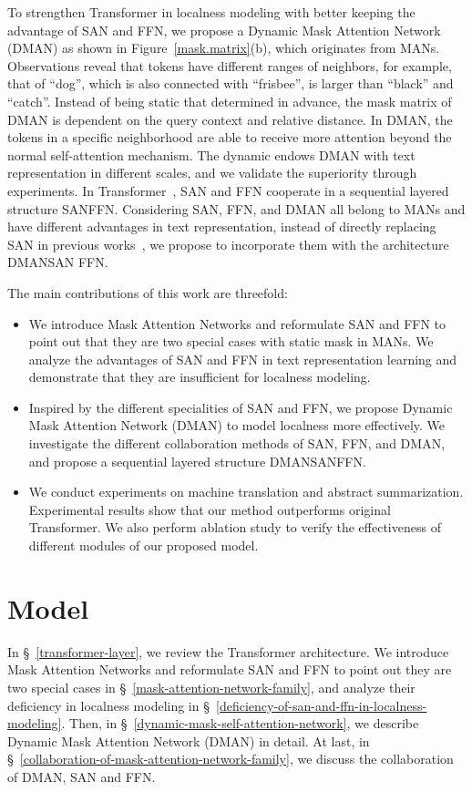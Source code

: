 \documentclass[11pt]{article}
\begin{document}
To strengthen Transformer in localness modeling with better keeping the advantage of SAN and FFN, we propose a Dynamic Mask Attention Network (DMAN) as shown in Figure~\ref{mask.matrix}(b), which originates from MANs. Observations reveal that tokens have different ranges of neighbors, for example, that of ``dog'', which is also connected with ``frisbee'', is larger than ``black'' and ``catch''.
Instead of being static that determined in advance, the mask matrix of DMAN is dependent on the query context and relative distance. 
In DMAN, the tokens in a specific neighborhood are able to receive more attention beyond the normal self-attention mechanism. The dynamic endows DMAN with text representation in different scales, and we validate the superiority through experiments. In Transformer~\cite{vaswani2017attention}, SAN and FFN cooperate in a sequential layered structure SANFFN. Considering SAN, FFN, and DMAN all belong to MANs and have different advantages in text representation, instead of directly replacing SAN in previous works~\cite{shaw2018self,yang2018modeling,guo2019gaussian}, we propose to incorporate them with the architecture DMANSAN FFN.




The main contributions of this work are threefold:
\begin{itemize}
\item We introduce Mask Attention Networks and reformulate SAN and FFN to point out that they are two special cases with static mask in MANs. We analyze the advantages of SAN and FFN in text representation learning and demonstrate that they are insufficient for localness modeling.
\item Inspired by the different specialities of SAN and FFN, we propose Dynamic Mask Attention Network (DMAN) to model localness more effectively. We investigate the different collaboration methods of SAN, FFN, and DMAN, and propose a sequential layered structure DMANSANFFN.
\item We conduct experiments on machine translation and abstract summarization. Experimental results show that our method outperforms original Transformer. We also perform ablation study to verify the effectiveness of different modules of our proposed model.
\end{itemize}

\section{Model}
In \S~\ref{transformer-layer}, we review the Transformer architecture. We introduce Mask Attention Networks and reformulate SAN and FFN to point out they are two special cases in \S~\ref{mask-attention-network-family}, and analyze their deficiency in localness modeling in \S~\ref{deficiency-of-san-and-ffn-in-localness-modeling}. Then, in \S~\ref{dynamic-mask-self-attention-network}, we describe Dynamic Mask Attention Network (DMAN) in detail. At last, in \S~\ref{collaboration-of-mask-attention-network-family}, we discuss the collaboration of DMAN, SAN and FFN.
\end{document}
